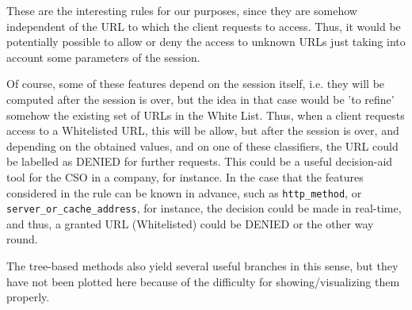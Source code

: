 \documentclass{llncs}
\begin{document}
These are the interesting rules for our purposes, since they are somehow independent of the URL to which the client requests to access. Thus, it would be potentially possible to allow or deny the access to unknown URLs just taking into account some parameters of the session.

Of course, some of these features depend on the session itself, i.e. they will be computed after the session is over, but the idea in that case would be 'to refine' somehow the existing set of URLs in the White List.
Thus, when a client requests access to a Whitelisted URL, this will be allow, but after the session is over, and depending on the obtained values, and on one of these classifiers, the URL could be labelled as DENIED for further requests.
This could be a useful decision-aid tool for the CSO in a company, for instance.
In the case that the features considered in the rule can be known in advance, such as \texttt{http\_method}, or \texttt{server\_or\_cache\_address}, for instance, the decision could be made in real-time, and thus, a granted URL (Whitelisted) could be DENIED or the other way round.

The tree-based methods also yield several useful branches in this sense, but they have not been plotted here because of the difficulty for showing/visualizing them properly.

%
%
%
%
%
%
%
%
%
%
%
%
%
%
%
\end{document}

